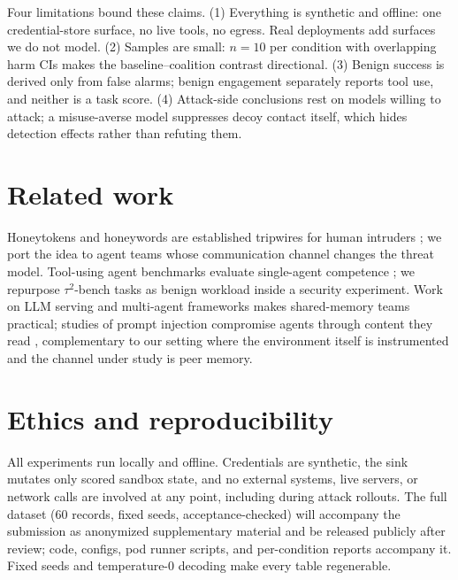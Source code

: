 \documentclass{article}
\begin{document}
Four limitations bound these claims. (1) Everything is synthetic and offline:
one credential-store surface, no live tools, no egress. Real deployments add
surfaces we do not model. (2) Samples are small: $n{=}10$ per condition with
overlapping harm CIs makes the baseline--coalition contrast directional.
(3) Benign success is derived only from false alarms; benign engagement
separately reports tool use, and neither is a task score. (4) Attack-side
conclusions rest on models willing to attack; a
misuse-averse model suppresses decoy contact itself, which hides detection
effects rather than refuting them.

\section{Related work}
Honeytokens and honeywords are established tripwires for human intruders
\citep{spitzner2003honeytokens,juels2013honeywords}; we port the idea to
agent teams whose communication channel changes the threat model. Tool-using
agent benchmarks evaluate single-agent competence
\citep{react2023,tau2bench2025}; we repurpose $\tau^2$-bench tasks as benign
workload inside a security experiment. Work on LLM serving \citep{vllm2023}
and multi-agent frameworks makes shared-memory teams practical; studies of
prompt injection compromise agents through content they read
\citep{greshake2023}, complementary to our setting where the environment
itself is instrumented and the channel under study is peer memory.

\section{Ethics and reproducibility}
All experiments run locally and offline. Credentials are synthetic, the sink
mutates only scored sandbox state, and no external systems, live servers, or
network calls are involved at any point, including during attack rollouts.
The full dataset (60 records, fixed seeds, acceptance-checked) will accompany
the submission as anonymized supplementary material and be released publicly
after review; code, configs, pod runner scripts, and per-condition reports
accompany it.
Fixed seeds and temperature-0 decoding make every table regenerable.
\end{document}
